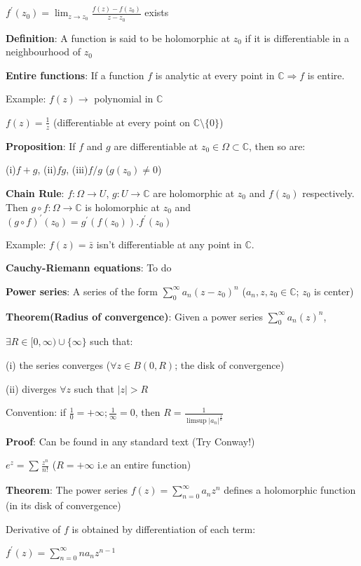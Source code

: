 \documentclass{article}
\begin{document}
\begin{flushleft}
$f^{'}(z_0)= \lim_{z \to z_0} \frac{f(z)-f(z_0)}{z-z_0}$ exists 

\textbf{Definition}: A function is said to be holomorphic at $z_0$ if it is differentiable in a neighbourhood of $z_0$

\textbf{Entire functions}: If a function $f$ is analytic at every point in $\mathds{C}\Rightarrow f$ is entire.

Example: $f(z)\rightarrow$ polynomial in $\mathds{C}$ 

$f(z)=\frac{1}{z}$ (differentiable at every point on $\mathds{C}\setminus \{0\}$)

\textbf{Proposition}: If $f$ and $g$ are differentiable at $z_0\in \Omega \subset \mathds{C}$, then so are:

(i)$f+g$, (ii)$fg$, (iii)$f/g$ ($g(z_0)\neq 0$)

\textbf{Chain Rule}: $f:\Omega \rightarrow U$, $g:U\rightarrow \mathds{C}$ are holomorphic at $z_0$ and $f(z_0)$ respectively.
Then $g\circ f:\Omega\rightarrow \mathds{C}$ is holomorphic at $z_0$ and $(g\circ f)^{'}(z_0)=g^{'}(f(z_0)).f^{'}(z_0)$

Example: $f(z)=\bar{z}$ isn't differentiable at any point in $\mathds{C}$.

\textbf{Cauchy-Riemann equations}: To do 

\textbf{Power series}: A series of the form $\sum_{0}^{\infty} a_n(z-z_0)^n$ ($a_n,z,z_0\in \mathds{C}$; $z_0$ is center)

\textbf{Theorem(Radius of convergence)}: Given a power series $\sum_{0}^{\infty} a_n(z)^n$,

$\exists R\in [0,\infty) \cup \{\infty\}$ such that:

(i) the series converges ($\forall z\in B(0,R)$; the disk of convergence)

(ii) diverges $\forall z$ such that $|z|>R$ 

Convention: if $\frac{1}{0}=+\infty ; \frac{1}{\infty}=0$, then $R=\frac{1}{\limsup |a_n|^{\frac{1}{n}}}$

\textbf{Proof}: Can be found in any standard text (Try Conway!)

$e^z=\sum_{}^{}\frac{z^n}{n!}$ ($R=+\infty$ i.e an entire function)

\textbf{Theorem}: The power series $f(z)=\sum_{n=0}^{\infty} a_nz^n$ defines a holomorphic function (in its disk of convergence)

Derivative of $f$ is obtained by differentiation of each term:

$f^{'}(z)=\sum_{n=0}^{\infty} na_nz^{n-1}$ 


\end{flushleft}
\end{document}

